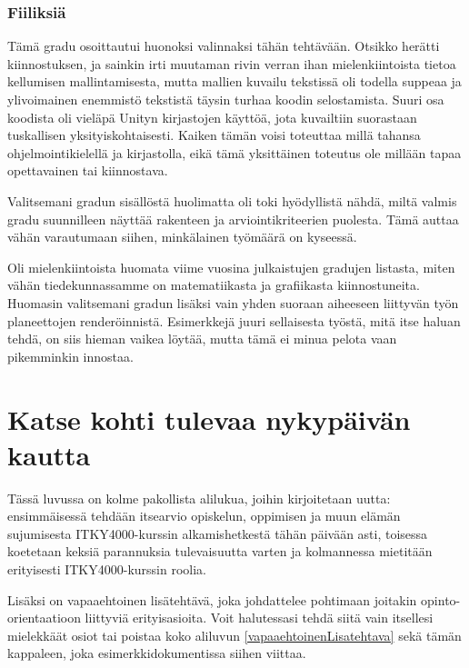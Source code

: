 \documentclass[utf8]{gradu3}
\begin{document}
\subsection{Fiiliksiä}

Tämä gradu osoittautui huonoksi valinnaksi tähän tehtävään. Otsikko herätti
kiinnostuksen, ja sainkin irti muutaman rivin verran ihan mielenkiintoista
tietoa kellumisen mallintamisesta, mutta mallien kuvailu tekstissä oli todella
suppeaa ja ylivoimainen enemmistö tekstistä täysin turhaa koodin selostamista.
Suuri osa koodista oli vieläpä Unityn kirjastojen käyttöä, jota kuvailtiin
suorastaan tuskallisen yksityiskohtaisesti. Kaiken tämän voisi toteuttaa millä
tahansa ohjelmointikielellä ja kirjastolla, eikä tämä yksittäinen toteutus ole
millään tapaa opettavainen tai kiinnostava.

Valitsemani gradun sisällöstä huolimatta oli toki hyödyllistä nähdä, miltä
valmis gradu suunnilleen näyttää rakenteen ja arviointikriteerien puolesta. Tämä
auttaa vähän varautumaan siihen, minkälainen työmäärä on kyseessä.

Oli mielenkiintoista huomata viime vuosina julkaistujen gradujen listasta, miten
vähän tiedekunnassamme on matematiikasta ja grafiikasta kiinnostuneita. Huomasin
valitsemani gradun lisäksi vain yhden suoraan aiheeseen liittyvän työn
planeettojen renderöinnistä. Esimerkkejä juuri sellaisesta työstä, mitä itse
haluan tehdä, on siis hieman vaikea löytää, mutta tämä ei minua pelota vaan
pikemminkin innostaa.


\chapter{Katse kohti tulevaa nykypäivän kautta}
\label{muitaAsioita}

Tässä luvussa on kolme pakollista alilukua, joihin kirjoitetaan uutta:
ensimmäisessä tehdään itsearvio opiskelun, oppimisen ja muun elämän
sujumisesta ITKY4000-kurssin alkamishetkestä tähän päivään asti,
toisessa koetetaan keksiä parannuksia tulevaisuutta varten ja
kolmannessa mietitään erityisesti ITKY4000-kurssin roolia.


Lisäksi on vapaaehtoinen lisätehtävä, joka johdattelee pohtimaan
joitakin opinto-orientaatioon liittyviä erityisasioita. Voit
halutessasi tehdä siitä vain itsellesi mielekkäät osiot tai poistaa
koko aliluvun \ref{vapaaehtoinenLisatehtava} sekä tämän kappaleen,
joka esimerkkidokumentissa siihen viittaa.
\end{document}
